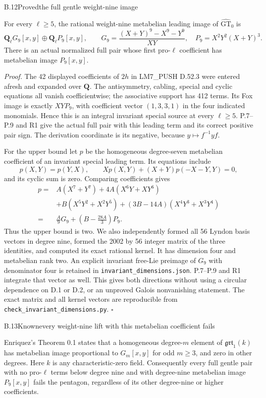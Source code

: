 \begin{statement}{B.12}{Proved}{the full gentle weight-nine image}
\end{statement}
For every $\ell\geq5$, the rational weight-nine metabelian leading
image of $\widehat{\mathrm{GT}}_0$ is
\[
 \mathbf Q_\ell G_9[x,y]\oplus\mathbf Q_\ell P_9[x,y],
 \qquad G_9=\frac{(X+Y)^9-X^9-Y^9}{XY},\quad
 P_9=X^2Y^2(X+Y)^3.
\]
There is an actual normalized full pair whose first pro-$\ell$
coefficient has metabelian image $P_9[x,y]$.

\emph{Proof.}
The 42 displayed coefficients of $2h$ in LM7\_PUSH D.52.3
were entered afresh and expanded over $\mathbf Q$. The
antisymmetry, cabling, special and cyclic equations all vanish
coefficientwise; the associative support has 412 terms. Its Fox
image is exactly $XY P_9$, with coefficient vector $(1,3,3,1)$
in the four indicated monomials. Hence this is an integral
invariant special source at every $\ell\geq5$. P.7--P.9 and
R1 give the actual full pair with this leading term and its
correct positive pair sign. The derivation coordinate is its
negative, because $y\mapsto f^{-1}yf$.

For the upper bound let $p$ be the homogeneous degree-seven
metabelian coefficient of an invariant special leading term.
Its equations include
\[
 p(X,Y)=p(Y,X),\qquad
 Xp(X,Y)+(X+Y)p(-X-Y,Y)=0,
\]
and its cyclic sum is zero. Comparing coefficients gives
\[
\begin{split}
p={}&A(X^7+Y^7)+4A(X^6Y+XY^6)\\
   &+B(X^5Y^2+X^2Y^5)+(3B-14A)(X^4Y^3+X^3Y^4)\\
 ={}&\frac A9G_9+\left(B-\frac{28A}{3}\right)P_9.
\end{split}
\]
Thus the upper bound is two. We also independently formed all
56 Lyndon basis vectors in degree nine, formed the 2002 by 56
integer matrix of the three identities, and computed its exact
rational kernel. It has dimension four and metabelian rank two.
An explicit invariant free-Lie preimage of $G_9$ with denominator
four is retained in \texttt{invariant\_dimensions.json}. P.7--P.9
and R1 integrate that vector as well. This gives both directions
without using a circular dependence on D.1 or D.2, or an unproved
Galois nonvanishing statement. The exact matrix and all kernel
vectors are reproducible from \texttt{check\_invariant\_dimensions.py}.
\hfill$\square$

\begin{statement}{B.13}{Known}{every weight-nine lift with this metabelian coefficient fails}
\citep[Theorem 0.1]{LiftEnriquez2006}
\end{statement}
Enriquez's Theorem 0.1 states that a homogeneous degree-$m$
element of $\mathfrak{grt}_1(k)$ has metabelian image proportional
to $G_m[x,y]$ for odd $m\geq3$, and zero in other degrees.
Here $k$ is any characteristic-zero field. Consequently every
full gentle pair with no pro-$\ell$ terms below degree nine and
with degree-nine metabelian image $P_9[x,y]$ fails the pentagon,
regardless of its other degree-nine or higher coefficients.

